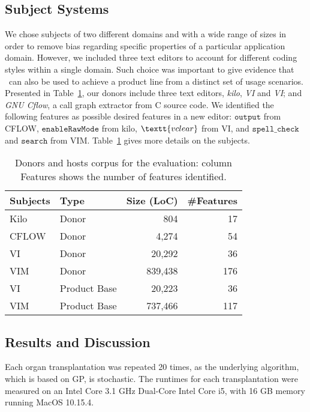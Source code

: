 \subsection{Subject Systems}

We chose subjects of two different domains and with a wide range of sizes in order to remove bias regarding specific properties of a particular application domain. However, we included three text editors to account for different coding styles within a single domain. Such choice was important to give evidence that \autoscalpel~can also be used to achieve a product line from a distinct set of usage scenarios. 
Presented in Table~\ref{tab:donors_list}, our donors include three text editors, \emph{kilo}, \emph{VI} and \emph{VI}; and \emph{GNU Cflow}, a call graph extractor from C source code. We identified the following features as possible desired features in a new editor: $\texttt{output}$ from CFLOW, $\texttt{enableRawMode}$ from kilo, $\textt{vclear}$ from VI, and $\texttt{spell\_check}$ and $\texttt{search}$ from VIM. Table~\ref{tab:donors_list} gives more details on the subjects.

\begin{table}[t]
\centering \small
	\caption{Donors and hosts corpus for the evaluation: column Features shows the number of features identified. 
	}
	\label{tab:donors_list}
	\begin{tabular}{llrr} \hline
        Subjects &Type  & Size (LoC) & \#Features   \\\hline
	    Kilo     &Donor & 804        & 17      \\
		CFLOW    &Donor & 4,274      & 54      \\
		VI       &Donor & 20,292     & 36      \\
		VIM      &Donor & 839,438    & 176      \\\hline
		VI       &Product Base & 20,223 & 36      \\
		VIM      &Product Base & 737,466 & 117     \\\hline
	\end{tabular}
\end{table}

\subsection{Results and Discussion} \label{sec:result_discussion}

Each organ transplantation was repeated 20 times, as the underlying algorithm, which is based on GP, is stochastic. The runtimes for each transplantation were measured on an Intel Core 3.1 GHz Dual-Core Intel Core i5, with 16 GB memory running MacOS 10.15.4.
  

